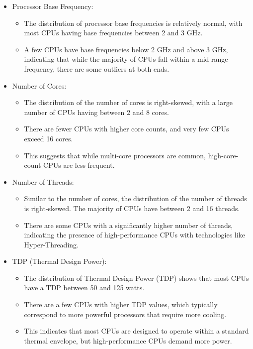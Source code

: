 \begin{itemize}
    \item Processor Base Frequency: 
    \begin{itemize}
        \item The distribution of processor base frequencies is relatively normal, with most CPUs having base frequencies between 2 and 3 GHz.
        \item A few CPUs have base frequencies below 2 GHz and above 3 GHz, indicating that while the majority of CPUs fall within a mid-range frequency, there are some outliers at both ends.
    \end{itemize}
    
    \item Number of Cores: 
    \begin{itemize}
        \item The distribution of the number of cores is right-skewed, with a large number of CPUs having between 2 and 8 cores.
        \item There are fewer CPUs with higher core counts, and very few CPUs exceed 16 cores.
        \item This suggests that while multi-core processors are common, high-core-count CPUs are less frequent.        
    \end{itemize}

    \item Number of Threads: 
    \begin{itemize}
        \item Similar to the number of cores, the distribution of the number of threads is right-skewed.
        The majority of CPUs have between 2 and 16 threads.
        \item There are some CPUs with a significantly higher number of threads, indicating the presence of high-performance CPUs with technologies like Hyper-Threading.     
    \end{itemize}

    \item TDP (Thermal Design Power):
    \begin{itemize}
        \item The distribution of Thermal Design Power (TDP) shows that most CPUs have a TDP between 50 and 125 watts.
        \item There are a few CPUs with higher TDP values, which typically correspond to more powerful processors that require more cooling.
        \item This indicates that most CPUs are designed to operate within a standard thermal envelope, but high-performance CPUs demand more power.
    \end{itemize}


\end{itemize}
